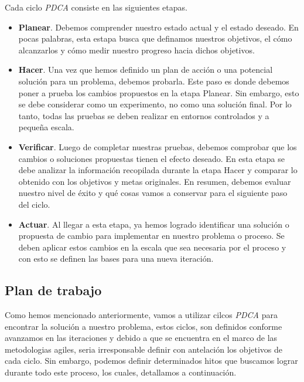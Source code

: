 Cada ciclo \textit{PDCA} consiste en las siguientes etapas.

\begin{itemize}
    \item \textbf{Planear}. Debemos comprender nuestro estado actual y el estado deseado. En pocas palabras, esta estapa busca que definamos nuestros objetivos, el cómo alcanzarlos y cómo medir nuestro progreso hacia dichos objetivos.
    \item \textbf{Hacer}. Una vez que hemos definido un plan de acción o una potencial solución para un problema, debemos probarla. Este paso es donde debemos poner a prueba los cambios propuestos en la etapa Planear. Sin embargo, esto se debe considerar como un experimento, no como una solución final. Por lo tanto, todas las pruebas se deben realizar en entornos controlados y a pequeña escala.
    \item \textbf{Verificar}. Luego de completar nuestras pruebas, debemos comprobar que los cambios o soluciones propuestas tienen el efecto deseado. En esta etapa se debe analizar la información recopilada durante la etapa Hacer y comparar lo obtenido con los objetivos y metas originales. En resumen, debemos evaluar nuestro nivel de éxito y qué cosas vamos a conservar para el siguiente paso del ciclo.
    \item \textbf{Actuar}. Al llegar a esta etapa, ya hemos logrado identificar una solución o propuesta de cambio para implementar en nuestro problema o proceso. Se deben aplicar estos cambios en la escala que sea necesaria por el proceso y con esto se definen las bases para una nueva iteración.
\end{itemize}

\subsection{Plan de trabajo}
\label{sec:plan-de-trabajo}

Como hemos mencionado anteriormente, vamos a utilizar cilcos \textit{PDCA} para encontrar la solución a nuestro problema, estos ciclos, son definidos conforme avanzamos en las iteraciones y debido a que se encuentra en el marco de las metodologias agiles, seria irresponsable definir con antelación los objetivos de cada ciclo. Sin embargo, podemos definir determinados hitos que buscamos lograr durante todo este proceso, los cuales, detallamos a continuación.

